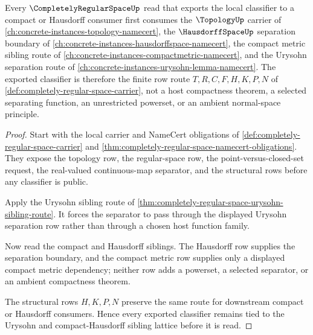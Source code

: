 \begin{theorem}
\label{thm:completely-regular-space-compact-hausdorff-urysohn-route}
Every $\CompletelyRegularSpaceUp$ read that exports the local classifier to a compact or Hausdorff consumer first consumes the $\TopologyUp$ carrier of \autoref{ch:concrete-instances-topology-namecert}, the $\HausdorffSpaceUp$ separation boundary of \autoref{ch:concrete-instances-hausdorffspace-namecert}, the compact metric sibling route of \autoref{ch:concrete-instances-compactmetric-namecert}, and the Urysohn separation route of \autoref{ch:concrete-instances-urysohn-lemma-namecert}. The exported classifier is therefore the finite row route $T,R,C,F,H,K,P,N$ of \autoref{def:completely-regular-space-carrier}, not a host compactness theorem, a selected separating function, an unrestricted powerset, or an ambient normal-space principle.
\end{theorem}
\begin{proof}
Start with the local carrier and NameCert obligations of \autoref{def:completely-regular-space-carrier} and \autoref{thm:completely-regular-space-namecert-obligations}. They expose the topology row, the regular-space row, the point-versus-closed-set request, the real-valued continuous-map separator, and the structural rows before any classifier is public.

Apply the Urysohn sibling route of \autoref{thm:completely-regular-space-urysohn-sibling-route}. It forces the separator to pass through the displayed Urysohn separation row rather than through a chosen host function family.

Now read the compact and Hausdorff siblings. The Hausdorff row supplies the separation boundary, and the compact metric row supplies only a displayed compact metric dependency; neither row adds a powerset, a selected separator, or an ambient compactness theorem.

The structural rows $H,K,P,N$ preserve the same route for downstream compact or Hausdorff consumers. Hence every exported classifier remains tied to the Urysohn and compact-Hausdorff sibling lattice before it is read.
\end{proof}

